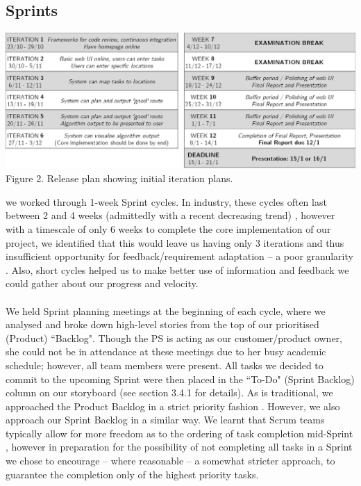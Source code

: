 \documentclass[a4paper, 10pt]{report}
\begin{document}
\subsection{Sprints}
\begin{center}
\includegraphics[scale=0.7]{release_plan.png}\\
Figure 2. Release plan showing initial iteration plans.
\end{center}
we worked through 1-week Sprint cycles. In industry, these cycles often last between 2 and 4 weeks (admittedly with a recent decreasing trend) \cite{sprint-len}, however with a timescale of only 6 weeks to complete the core implementation of our project, we identified that this would leave us having only 3 iterations and thus insufficient opportunity for feedback/requirement adaptation -- a poor granularity \cite{sprint-small-gd}. Also, short cycles helped us to make better use of information and feedback we could gather about our progress and velocity.\\\\
We held Sprint planning meetings at the beginning of each cycle, where we analysed and broke down high-level stories from the top of our prioritised (Product) ``Backlog". Though the PS is acting as our customer/product owner, she could not be in attendance at these meetings due to her busy academic schedule; however, all team members were present. All tasks we decided to commit to the upcoming Sprint were then placed in the ``To-Do" (Sprint Backlog) column on our storyboard (see section 3.4.1 for details). As is traditional, we approached the Product Backlog in a strict priority fashion \cite{sprint-backlog}. However, we also approach our Sprint Backlog in a similar way. We learnt that Scrum teams typically allow for more freedom as to the ordering of task completion mid-Sprint \cite{sprint-middle}, however in preparation for the possibility of not completing all tasks in a Sprint we chose to encourage -- where reasonable -- a somewhat stricter approach, to guarantee the completion only of the highest priority tasks.
\end{document}
